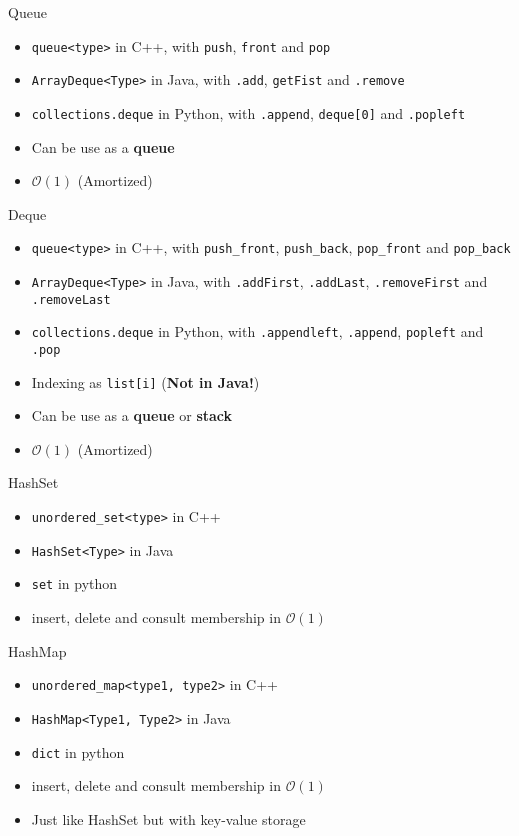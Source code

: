 \documentclass{beamer}
\begin{document}
\begin{frame}{Queue}
  \begin{itemize}
  \item \texttt{queue<type>} in C++, with \texttt{push}, \texttt{front} and \texttt{pop}
  \item \texttt{ArrayDeque<Type>} in Java, with \texttt{.add}, \texttt{getFist} and \texttt{.remove}
  \item \texttt{collections.deque} in Python, with \texttt{.append}, \texttt{deque[0]} and \texttt{.popleft}
  \item Can be use as a \textbf{queue}
  \item $\mathcal{O}(1)$ (Amortized)
\end{itemize}
\end{frame}

\begin{frame}{Deque}
  \begin{itemize}
  \item \texttt{queue<type>} in C++, with \texttt{push\_front}, \texttt{push\_back}, \texttt{pop\_front} and \texttt{pop\_back}
  \item \texttt{ArrayDeque<Type>} in Java, with \texttt{.addFirst}, \texttt{.addLast}, \texttt{.removeFirst} and \texttt{.removeLast}
  \item \texttt{collections.deque} in Python, with \texttt{.appendleft}, \texttt{.append}, \texttt{popleft} and \texttt{.pop}
  \item Indexing as \texttt{list[i]} (\textbf{Not in Java!})
  \item Can be use as a \textbf{queue} or \textbf{stack} 
  \item $\mathcal{O}(1)$ (Amortized)
\end{itemize}
\end{frame}

\begin{frame}{HashSet}
  \begin{itemize}
  \item \texttt{unordered\_set<type>} in C++
  \item \texttt{HashSet<Type>} in Java
  \item \texttt{set} in python
  \item insert, delete and consult membership in $\mathcal{O}(1)$ 
  \end{itemize}
\end{frame}

\begin{frame}{HashMap}
  \begin{itemize}
  \item \texttt{unordered\_map<type1, type2>} in C++
  \item \texttt{HashMap<Type1, Type2>} in Java
  \item \texttt{dict} in python
  \item insert, delete and consult membership in $\mathcal{O}(1)$
  \item Just like HashSet but with key-value storage 
  \end{itemize}
\end{frame}
\end{document}
